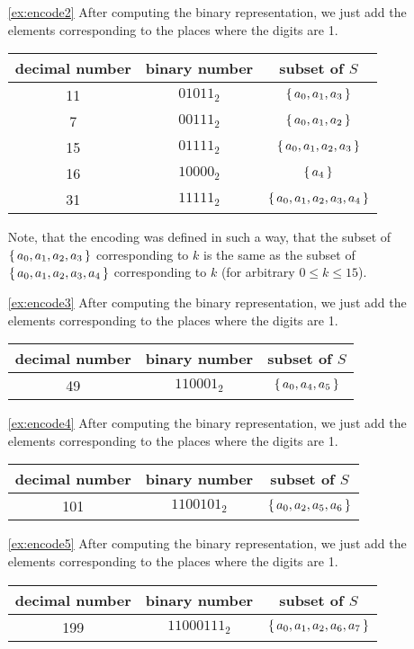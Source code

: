 \begin{enumerate}
\item[\ref{ex:encode2}]
After computing the binary representation, 
we just add the elements corresponding to the places where the digits are 1. 
\begin{center}
\begin{tabular}{c|c|c}
decimal number & binary number & subset of $S$ \\
\hline 
11 & $01011_2$ & $\left\{\,a_0, a_1, a_3\,\right\}$ \\
7 & $00111_2$ & $\left\{\,a_0, a_1, a_2\,\right\}$ \\
15 & $01111_2$ & $\left\{\,a_0, a_1, a_2, a_3\,\right\}$ \\
16 & $10000_2$ & $\left\{\,a_4\,\right\}$ \\
31 & $11111_2$ & $\left\{\,a_0, a_1, a_2, a_3, a_4\,\right\}$
\end{tabular}
\end{center}
Note, that the encoding was defined in such a way, 
that the subset of $\left\{\,a_0, a_1, a_2, a_3\,\right\}$ corresponding to $k$ is the same as 
the subset of $\left\{\,a_0, a_1, a_2, a_3, a_4\,\right\}$ corresponding to $k$ (for arbitrary $0\leq k\leq 15$). 

\item[\ref{ex:encode3}]
After computing the binary representation, 
we just add the elements corresponding to the places where the digits are 1. 
\begin{center}
\begin{tabular}{c|c|c}
decimal number & binary number & subset of $S$ \\
\hline 
49 & $110001_2$ & $\left\{\,a_0, a_4, a_5\,\right\}$
\end{tabular}
\end{center}

\item[\ref{ex:encode4}]
After computing the binary representation, 
we just add the elements corresponding to the places where the digits are 1. 
\begin{center}
\begin{tabular}{c|c|c}
decimal number & binary number & subset of $S$ \\
\hline 
101 & $1100101_2$ & $\left\{\,a_0, a_2, a_5, a_6\,\right\}$
\end{tabular}
\end{center}

\item[\ref{ex:encode5}]
After computing the binary representation, 
we just add the elements corresponding to the places where the digits are 1. 
\begin{center}
\begin{tabular}{c|c|c}
decimal number & binary number & subset of $S$ \\
\hline 
199 & $11000111_2$ & $\left\{\,a_0, a_1, a_2, a_6, a_7\,\right\}$
\end{tabular}
\end{center}



\end{enumerate}
